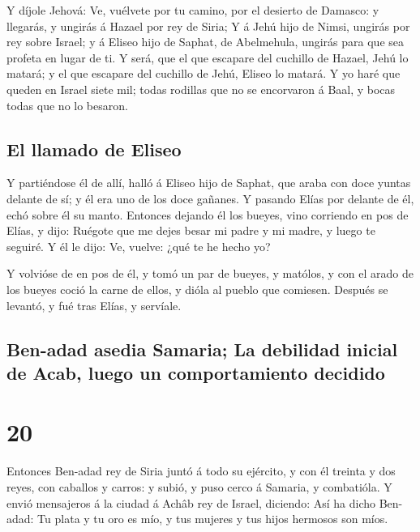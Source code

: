  Y díjole Jehová: Ve, vuélvete por tu camino, por el
desierto de Damasco: y llegarás, y ungirás á Hazael por rey de Siria;
 Y á Jehú hijo de Nimsi, ungirás por rey sobre Israel; y á
Eliseo hijo de Saphat, de Abelmehula, ungirás para que sea profeta en
lugar de ti.  Y será, que el que escapare del cuchillo de
Hazael, Jehú lo matará; y el que escapare del cuchillo de Jehú, Eliseo
lo matará.  Y yo haré que queden en Israel siete mil; todas
rodillas que no se encorvaron á Baal, y bocas todas que no lo besaron.

\hypertarget{el-llamado-de-eliseo}{%
\subsection{El llamado de Eliseo}\label{el-llamado-de-eliseo}}

 Y partiéndose él de allí, halló á Eliseo hijo de Saphat,
que araba con doce yuntas delante de sí; y él era uno de los doce
gañanes. Y pasando Elías por delante de él, echó sobre él su manto.
 Entonces dejando él los bueyes, vino corriendo en pos de
Elías, y dijo: Ruégote que me dejes besar mi padre y mi madre, y luego
te seguiré. Y él le dijo: Ve, vuelve: ¿qué te he hecho yo?

 Y volvióse de en pos de él, y tomó un par de bueyes, y
matólos, y con el arado de los bueyes coció la carne de ellos, y dióla
al pueblo que comiesen. Después se levantó, y fué tras Elías, y
servíale.

\hypertarget{ben-adad-asedia-samaria-la-debilidad-inicial-de-acab-luego-un-comportamiento-decidido}{%
\subsection{Ben-adad asedia Samaria; La debilidad inicial de Acab, luego
un comportamiento
decidido}\label{ben-adad-asedia-samaria-la-debilidad-inicial-de-acab-luego-un-comportamiento-decidido}}

\hypertarget{section-19}{%
\section{20}\label{section-19}}

 Entonces Ben-adad rey de Siria juntó á todo su ejército, y
con él treinta y dos reyes, con caballos y carros: y subió, y puso cerco
á Samaria, y combatióla.  Y envió mensajeros á la ciudad á
Achâb rey de Israel, diciendo:  Así ha dicho Ben-adad: Tu
plata y tu oro es mío, y tus mujeres y tus hijos hermosos son míos.

